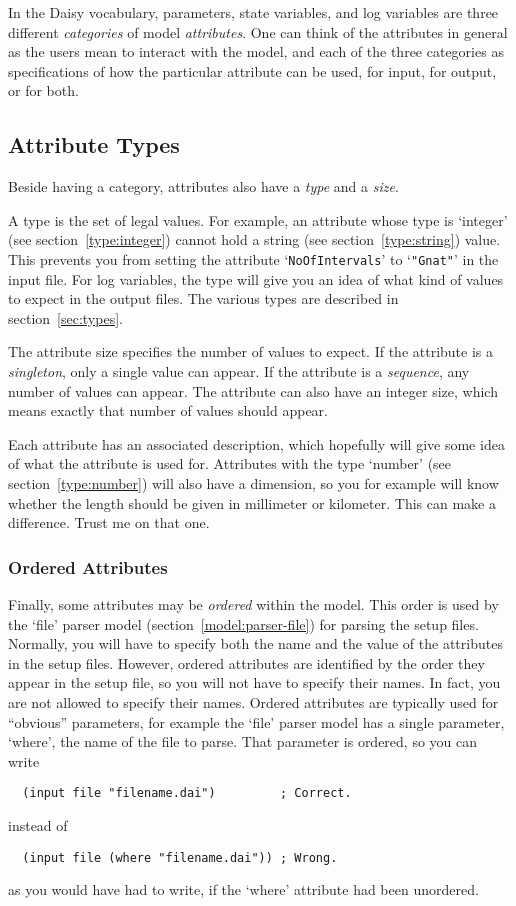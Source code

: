 In the Daisy vocabulary, parameters, state variables, and log
variables are three different \emph{categories} of model
\emph{attributes}.  One can think of the attributes in general as the
users mean to interact with the model, and each of the three
categories as specifications of how the particular attribute can be
used, for input, for output, or for both.

\subsection{Attribute Types}
\label{sec:attribute-types}

Beside having a category, attributes also have a \emph{type} and a
\emph{size}.

A type is the set of legal values.  For example, an attribute whose
type is `integer' (see section~\ref{type:integer}) cannot hold a
string (see section~\ref{type:string}) value.  This prevents you from
setting the attribute `\texttt{NoOfIntervals}' to `\texttt{"Gnat"}' in
the input file.  For log variables, the type will give you an idea of
what kind of values to expect in the output files.  The various types
are described in section~\ref{sec:types}.

The attribute size specifies the number of values to expect.  If the
attribute is a \emph{singleton}, only a single value can appear.  If
the attribute is a \emph{sequence}, any number of values can appear.
The attribute can also have an integer size, which means exactly that
number of values should appear.

Each attribute has an associated description, which hopefully will give
some idea of what the attribute is used for.  Attributes with the type
`number' (see section~\ref{type:number}) will also have a dimension,
so you for example will know whether the length should be given in
millimeter or kilometer.  This can make a difference.  Trust me on
that one.

\subsubsection{Ordered Attributes}

Finally, some attributes may be \emph{ordered} within the model.  This
order is used by the `file' parser model
(section~\ref{model:parser-file}) for parsing the setup files.
Normally, you will have to specify both the name and the value of the
attributes in the setup files.  However, ordered attributes are
identified by the order they appear in the setup file, so you will not
have to specify their names.  In fact, you are not allowed to specify
their names.  Ordered attributes are typically used for ``obvious''
parameters, for example the `file' parser model has a single
parameter, `where', the name of the file to parse.  That parameter is
ordered, so you can write
\begin{verbatim}
  (input file "filename.dai")         ; Correct.
\end{verbatim}
instead of
\begin{verbatim}
  (input file (where "filename.dai")) ; Wrong.
\end{verbatim}
as you would have had to write, if the `where' attribute had been
unordered. 

